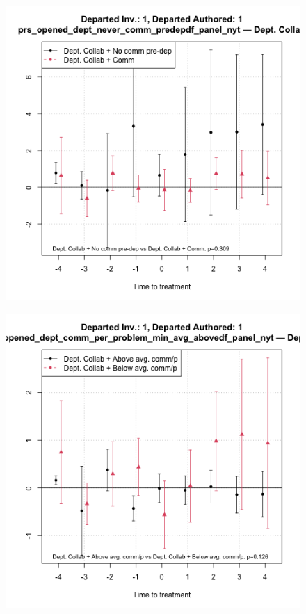 \begin{figure}[htbp]
    \centering
    \begin{minipage}[b]{0.32\textwidth}
        \centering
        \includegraphics[width=\textwidth]{temp/output/collab_imp/auth1_inv1_cs_norm_prs_opened_dept_never_comm_predep_Dept.Collab.png}
    \label{fig:prs_opened_comm_collab_int_predep}
    \end{minipage}
    \hfill
    \begin{minipage}[b]{0.32\textwidth}
        \centering
        \includegraphics[width=\textwidth]{temp/output/collab_imp/auth1_inv1_cs_norm_prs_opened_dept_comm_per_problem_min_avg_above_Dept.Collab.png}

\end{minipage}
\end{figure}
